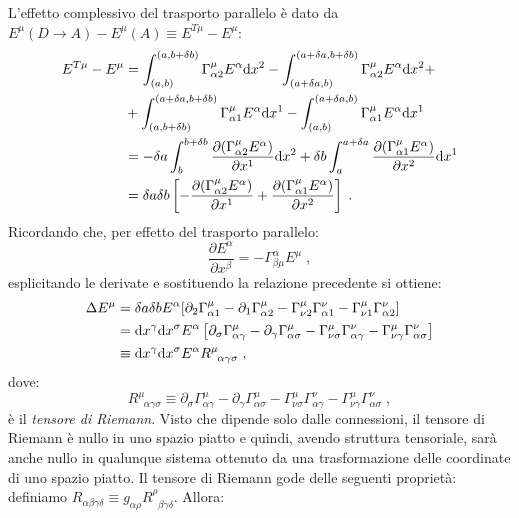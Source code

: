 \documentclass[12pt,a4paper]{report}
\theoremstyle{definition}
\newcommand{\diff}[1][]{\mathrm{d}#1}
\begin{document}
L'effetto complessivo del trasporto parallelo è dato da $E^{\mu}(D\to A)-E^{\mu}(A)\equiv E^{T\mu}-E^{\mu}$:
\begin{align}
E^{T\mu}-E^{\mu} &= \int_{(a,b)}^{(a,b+\delta b)}\Gamma^{\mu}_{\alpha 2}E^{\alpha}\diff{x^2}-\int_{(a+\delta a,b)}^{(a+\delta a,b+\delta b)}\Gamma^{\mu}_{\alpha 2}E^{\alpha}\diff{x^2}+ \notag \\
&+ \int_{(a,b+\delta b)}^{(a+\delta a,b+\delta b)}\Gamma^{\mu}_{\alpha 1}E^{\alpha}\diff{x^1}-\int_{(a,b)}^{(a+\delta a,b)}\Gamma^{\mu}_{\alpha 1}E^{\alpha}\diff{x^1} \notag \\
&=-\delta a\int_b^{b+\delta b}\frac{\partial(\Gamma^{\mu}_{\alpha 2}E^{\alpha})}{\partial x^1}\diff{x^2}+\delta b\int_a^{a+\delta a}\frac{\partial (\Gamma^{\mu}_{\alpha 1}E^{\alpha})}{\partial x^2}\diff{x^1} \notag \\
&=\delta a\delta b\left[-\frac{\partial(\Gamma^{\mu}_{\alpha 2}E^{\alpha})}{\partial x^1}+\frac{\partial (\Gamma^{\mu}_{\alpha 1}E^{\alpha})}{\partial x^2}\right]\;.
\end{align}
Ricordando che, per effetto del trasporto parallelo:
$$
\frac{\partial E^{\alpha}}{\partial x^{\beta}}=-\Gamma^{\alpha}_{\beta\mu}E^{\mu}\;,
$$
esplicitando le derivate e sostituendo la relazione precedente si ottiene:
\begin{align}
\Delta E^{\mu} &= \delta a\delta b E^{\alpha}[\partial_2\Gamma^{\mu}_{\alpha 1}-\partial_1\Gamma^{\mu}_{\alpha 2}-\Gamma^{\mu}_{\nu 2}\Gamma^{\nu}_{\alpha 1}-\Gamma^{\mu}_{\nu 1}\Gamma^{\nu}_{\alpha 2}] \notag \\
&= \diff{x^{\gamma}}\diff{x^{\sigma}}E^{\alpha}\left[\partial_{\sigma}\Gamma^{\mu}_{\alpha\gamma}-\partial_{\gamma}\Gamma^{\mu}_{\alpha\sigma}-\Gamma^{\mu}_{\nu\sigma}\Gamma^{\nu}_{\alpha\gamma}-\Gamma^{\mu}_{\nu\gamma}\Gamma^{\nu}_{\alpha\sigma}\right] \notag \\
&\equiv\diff{x^{\gamma}}\diff{x^{\sigma}}E^{\alpha}R^{\mu}_{\;\;\alpha\gamma\sigma}\;,
\end{align}
dove:
\begin{equation}
R^{\mu}_{\;\;\alpha\gamma\sigma}\equiv \partial_{\sigma}\Gamma^{\mu}_{\alpha\gamma}-\partial_{\gamma}\Gamma^{\mu}_
{\alpha\sigma}-\Gamma^{\mu}_{\nu\sigma}\Gamma^{\nu}_{\alpha\gamma}-\Gamma^{\mu}_{\nu\gamma}\Gamma^{\nu}_{\alpha\sigma}\;,
\end{equation}
è il \emph{tensore di Riemann}. Visto che dipende solo dalle connessioni, il tensore di Riemann è nullo in uno spazio piatto e quindi, avendo struttura tensoriale, sarà anche nullo in qualunque sistema ottenuto da una trasformazione delle coordinate di uno spazio piatto. Il tensore di Riemann gode delle seguenti proprietà: definiamo $R_{\alpha\beta\gamma\delta}\equiv g_{\alpha\rho}R^{\rho}_{\;\;\beta\gamma\delta}$. Allora:
\end{document}
